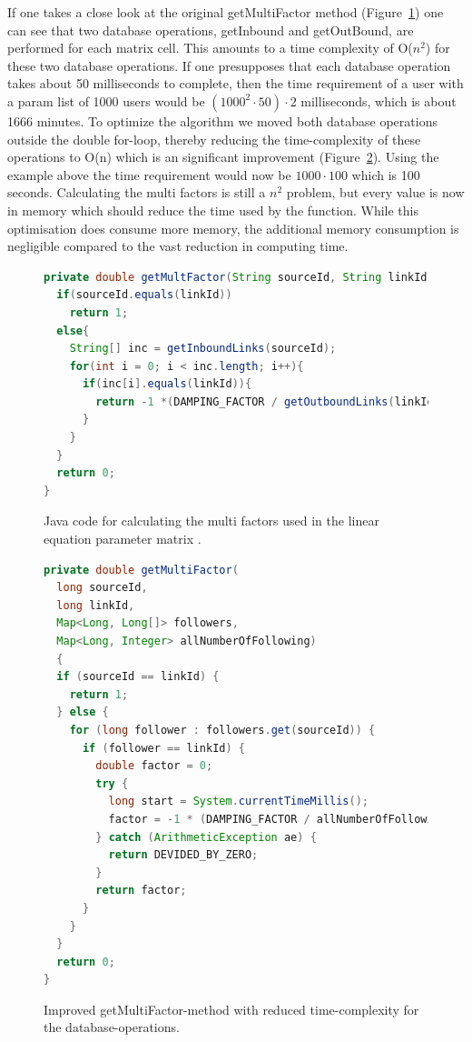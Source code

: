 If one takes a close look at the original getMultiFactor method (Figure~\ref{fig:getmultifactor}) one can see that two database operations, getInbound and getOutBound, are performed for each matrix cell. This amounts to a time complexity of O(\( n^2\)) for these two database operations. If one presupposes that each database operation takes about 50 milliseconds to complete, then the time requirement of a user with a param list of 1000 users would be  \((1000^2 \cdot 50) \cdot 2\) milliseconds, which is about 1666 minutes. To optimize the algorithm we moved both database operations outside the double for-loop, thereby reducing the time-complexity of these operations to O(n) which is an significant improvement (Figure~\ref{fig:getmultifactorimproved}). Using the example above the time requirement would now be \(1000 \cdot 100\) which is 100 seconds. Calculating the multi factors is still a \(n^2\) problem, but every value is now in memory which should reduce the time used by the function. While this optimisation does consume more memory, the additional memory consumption is negligible compared to the vast reduction in computing time.

\begin{figure}[h!]
\begin{lstlisting}[language=java]
private double getMultFactor(String sourceId, String linkId){ 
  if(sourceId.equals(linkId)) 
    return 1;
  else{
    String[] inc = getInboundLinks(sourceId); 
    for(int i = 0; i < inc.length; i++){ 
      if(inc[i].equals(linkId)){ 
        return -1 *(DAMPING_FACTOR / getOutboundLinks(linkId).length);
      } 
    }
  } 
  return 0;
}
\end{lstlisting}
\caption{Java code for calculating the multi factors used in the linear equation parameter matrix \protect \cite{Goodrarzi2009}.}
\label{fig:getmultifactor}
\end{figure}

\begin{figure}[h!]
\begin{lstlisting}[language=java]
private double getMultiFactor(
  long sourceId, 
  long linkId, 
  Map<Long, Long[]> followers, 
  Map<Long, Integer> allNumberOfFollowing) 
  {
  if (sourceId == linkId) {
    return 1;
  } else {
    for (long follower : followers.get(sourceId)) {
      if (follower == linkId) {
        double factor = 0;
        try {
          long start = System.currentTimeMillis();
          factor = -1 * (DAMPING_FACTOR / allNumberOfFollowing.get(linkId));
        } catch (ArithmeticException ae) {
          return DEVIDED_BY_ZERO;
        }
        return factor;
      }
    }
  }
  return 0;
}
\end{lstlisting}
\caption{Improved getMultiFactor-method with reduced time-complexity for the database-operations.}
\label{fig:getmultifactorimproved}
\end{figure}


